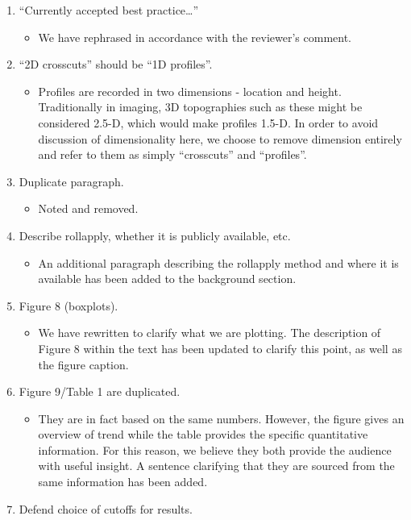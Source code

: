 \documentclass[12pt]{article}
\providecommand{\tightlist}{%
  \setlength{\itemsep}{0pt}\setlength{\parskip}{0pt}}
\begin{document}
\begin{enumerate}
\def\labelenumi{\arabic{enumi}.}
\tightlist
\item
  ``Currently accepted best practice\ldots{}''

  \begin{itemize}
  \tightlist
  \item
    We have rephrased in accordance with the reviewer's comment.
  \end{itemize}
\item
  ``2D crosscuts'' should be ``1D profiles''.

  \begin{itemize}
  \tightlist
  \item
    Profiles are recorded in two dimensions - location and height.
    Traditionally in imaging, 3D topographies such as these might be
    considered 2.5-D, which would make profiles 1.5-D. In order to avoid
    discussion of dimensionality here, we choose to remove dimension
    entirely and refer to them as simply ``crosscuts'' and
    ``profiles''.\\
  \end{itemize}
\item
  Duplicate paragraph.

  \begin{itemize}
  \tightlist
  \item
    Noted and removed.
  \end{itemize}
\item
  Describe rollapply, whether it is publicly available, etc.

  \begin{itemize}
  \tightlist
  \item
    An additional paragraph describing the rollapply method and where it
    is available has been added to the background section.
  \end{itemize}
\item
  Figure 8 (boxplots).

  \begin{itemize}
  \tightlist
  \item
    We have rewritten to clarify what we are plotting. The description
    of Figure 8 within the text has been updated to clarify this point,
    as well as the figure caption.
  \end{itemize}
\item
  Figure 9/Table 1 are duplicated.

  \begin{itemize}
  \tightlist
  \item
    They are in fact based on the same numbers. However, the figure
    gives an overview of trend while the table provides the specific
    quantitative information. For this reason, we believe they both
    provide the audience with useful insight. A sentence clarifying that
    they are sourced from the same information has been added.
  \end{itemize}
\item
  Defend choice of cutoffs for results.


\end{enumerate}
\end{document}
